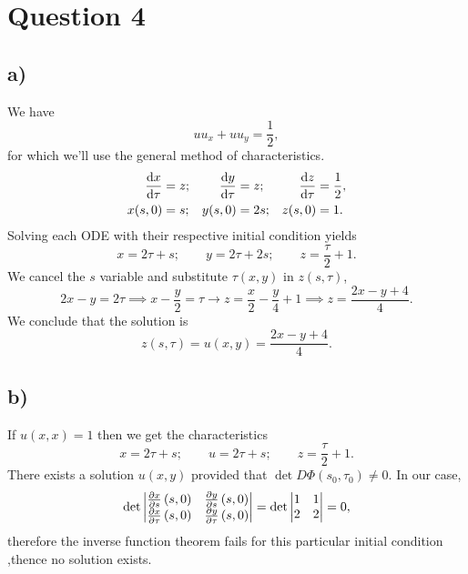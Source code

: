 \documentclass[12pt]{article}
\theoremstyle{definition}
\theoremstyle{definition}
\theoremstyle{definition}
\theoremstyle{definition}
\theoremstyle{definition}
\theoremstyle{example}
\theoremstyle{note}
\theoremstyle{remark}
\theoremstyle{example}
\begin{document}
			\section*{Question 4}
			\subsection*{a) }
				We have 
				$$ u u_{x} + u u_{y} = \frac12,$$
				for which we'll use the general method of characteristics.
				\begin{align*}
					\dv{x}{\tau} &= z; & \dv{y}{\tau} &= z; & \dv{z}{\tau} &= \frac12, \\
					x(s,0) &= s; & y(s,0) &= 2s; & z(s,0) &= 1.
				\end{align*}
				Solving each ODE with their respective initial condition yields 
				$$ x = 2\tau+s; \qquad y = 2\tau +2s ; \qquad z =\frac{\tau}{2} +1.$$
				We cancel the $s$ variable and substitute $\tau(x,y)$ in $z(s,\tau)$, 
				$$ 2x -y = 2 \tau \implies  x- \frac{y}{2} = \tau \xrightarrow{} z = \frac{x}{2} - \frac{y}{4} +1 \implies z = \frac{2x - y  + 4}{4}.$$
				We conclude that the solution is 
				$$ z(s,\tau) = u(x,y) = \frac{2x - y +4}{4}.$$
			\subsection*{b)} 
				If $u(x,x) =1 $ then we get the characteristics 
				$$ x = 2\tau +s ; \qquad u =2\tau +s ; \qquad z = \frac{\tau}{2}+1.$$
				There exists a solution $u(x,y)$ provided that $\det D\Phi (s_{0},\tau_{0}) \neq 0$. In our case, 
				\[\det \begin{vmatrix}
					\pdv{x}{s} \left(s,0\right) & \pdv{y}{s}\left(s,0\right)\\
					\pdv{x}{\tau}\left(s,0\right) & \pdv{y}{\tau} \left(s,0\right)
				\end{vmatrix} = \det \begin{vmatrix}
					 1 & 1 \\ 2 & 2
				\end{vmatrix} = 0,
				\]
				therefore the inverse function theorem fails for this particular initial condition ,thence no solution exists.
\end{document}
